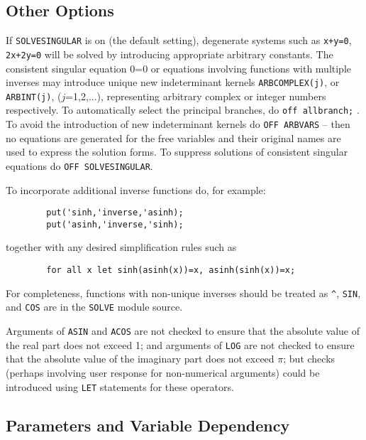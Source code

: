 \subsection{Other Options}

If {\tt SOLVESINGULAR} is on (the default setting),
degenerate systems such as {\tt x+y=0}, {\tt 2x+2y=0} will be solved by
introducing appropriate arbitrary constants.
The consistent singular equation 0=0 or equations involving functions with
multiple inverses may introduce unique new indeterminant kernels
{\tt ARBCOMPLEX(j)}, or {\tt ARBINT(j)}, ($j$=1,2,...),  %
representing arbitrary complex or integer numbers respectively.  To
automatically select the principal branches, do {\tt off allbranch;} .
 To avoid the introduction of new indeterminant kernels
do {\tt OFF ARBVARS} -- then no equations are generated for the free
variables and their original names are used to express the solution forms.
To suppress solutions of consistent singular equations do
{\tt OFF SOLVESINGULAR}.

To incorporate additional inverse functions do, for example:
\begin{verbatim}
        put('sinh,'inverse,'asinh);
        put('asinh,'inverse,'sinh);
\end{verbatim}
together with any desired simplification rules such as
\begin{verbatim}
        for all x let sinh(asinh(x))=x, asinh(sinh(x))=x;
\end{verbatim}
For completeness, functions with non-unique inverses should be treated as
{\tt \verb|^|}, {\tt SIN}, and {\tt COS} are in the {\tt SOLVE}
 module source.

Arguments of {\tt ASIN} and {\tt ACOS} are not checked to ensure that the
absolute value of the real part does not exceed 1; and arguments of
{\tt LOG} are not checked to  ensure that the absolute value of the imaginary
part does not exceed $\pi$; but checks (perhaps involving user response
for non-numerical arguments) could be introduced using
{\tt LET} statements for these operators.

\subsection{Parameters and Variable Dependency}

